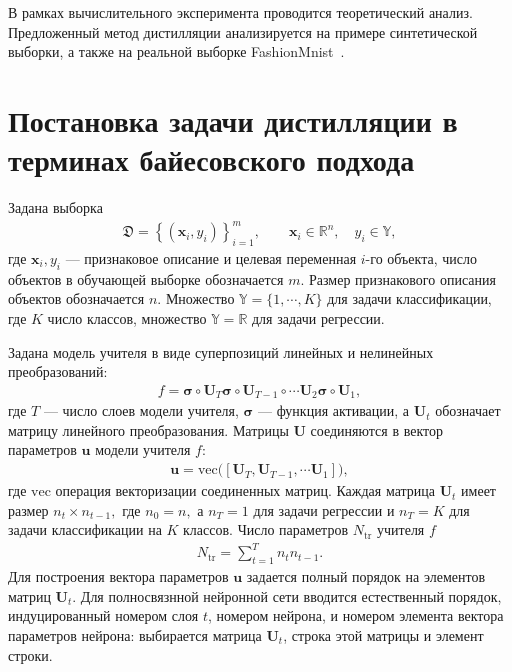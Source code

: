 В рамках вычислительного эксперимента проводится теоретический анализ. Предложенный метод дистилляции анализируется на примере синтетической выборки, а также на реальной выборке FashionMnist~\cite{fashionmnist}.

\section{Постановка задачи дистилляции в терминах байесовского подхода}
Задана выборка
\[
\label{eq:st:1}
\begin{aligned}
\mathfrak{D} = \left\{\left(\mathbf{x}_i, y_i\right)\right\}_{i=1}^{m}, \qquad \mathbf{x}_i \in \mathbb{R}^{n}, \quad y_i \in \mathbb{Y},
\end{aligned}
\]
где $\mathbf{x}_i, y_i$ --- признаковое описание и целевая переменная $i$-го объекта, число объектов в обучающей выборке обозначается $m$. Размер признакового описания объектов обозначается $n$. Множество $\mathbb{Y}=\{1,\cdots,K\}$ для задачи классификации, где $K$ число классов, множество $\mathbb{Y}=\mathbb{R}$ для задачи регрессии.

Задана модель учителя в виде суперпозиций линейных и нелинейных преобразований:
\[
\label{eq:st:2}
\begin{aligned}
f = \bm{\sigma} \circ \mathbf{U}_T \bm{\sigma} \circ \mathbf{U}_{T-1}\circ \cdots  \mathbf{U}_2\bm{\sigma} \circ \mathbf{U}_1,
\end{aligned}
\]
где $T$ --- число слоев модели учителя, $\bm{\sigma}$ --- функция активации, а $\mathbf{U}_t$ обозначает матрицу линейного преобразования. Матрицы $\mathbf{U}$ соединяются в вектор параметров $\mathbf{u}$ модели учителя $f$:
\[
\label{eq:st:2.1}
\begin{aligned}
\mathbf{u} = \text{vec}\bigr(\left[\mathbf{U}_T, \mathbf{U}_{T-1}, \cdots \mathbf{U}_1\right]\bigr),
\end{aligned}
\]
где $\text{vec}$ операция векторизации соединенных матриц.
Каждая матрица $\mathbf{U}_t$ имеет размер $n_t\times n_{t-1},$ где $n_0=n,$ а  $n_T={1}$ для задачи регрессии и $n_T=K$ для задачи классификации на $K$ классов. Число параметров $N_{\text{tr}}$ учителя $f$
\[
\label{eq:st:2.2}
\begin{aligned}
N_{\text{tr}} = \sum_{t=1}^{T}n_tn_{t-1}.
\end{aligned}
\]
Для построения вектора параметров $\mathbf{u}$ задается полный порядок на элементов матриц $\mathbf{U}_t$. Для полносвязнной нейронной сети вводится естественный порядок, индуцированный номером слоя $t$, номером нейрона, и номером элемента вектора параметров нейрона: выбирается матрица $\mathbf{U}_t$, строка этой матрицы и элемент строки.

